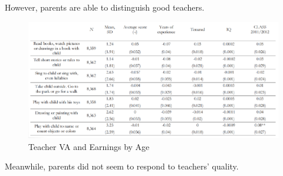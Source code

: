         However, parents are able to distinguish good teachers.
        \begin{figure}[H]
            \centering
            \includegraphics[width=4.5in]{images/ch9/9 Araujo 4.png}
            \caption{Teacher VA and Earnings by Age}
        \end{figure}
        Meanwhile, parents did not seem to respond to teachers' quality.